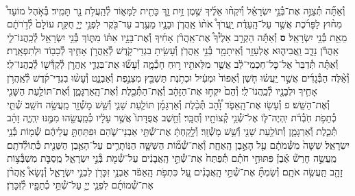 \documentclass[twoside, openany, parskip=half, 11pt]{book}
\begin{document}
\begin{footnotesize}
\begin{multicols}{2}
\\
וְ֯אַתָּ֞ה תְּ֯צַוֶּ֣ה אֶת־בְּ֯נֵ֣י יִשְׂרָאֵ֗ל וְ֯יִקְח֨וּ אֵלֶ֜יךָ שֶׁ֣מֶן זַ֥יִת זָ֛ךְ כָּתִ֖ית לַמָּא֑וֹר לְ֯הַֽעֲלֹ֥ת נֵ֖ר תָּמִֽיד׃ בְּ֯אֹ֣הֶל מוֹעֵד֩ מִח֨וּץ לַפָּרֹ֜כֶת אֲשֶׁ֣ר עַל־הָֽעֵדֻ֗ת יַֽעֲרֹךְ֩ אֹת֨וֹ אַֽהֲרֹ֧ן וּבָנָ֛יו מֵעֶ֥רֶב עַד־בֹּ֖קֶר לִפְנֵ֣י יְיָ֑ חֻקַּ֤ת עוֹלָם֙ לְ֯דֹ֣רֹתָ֔ם מֵאֵ֖ת בְּ֯נֵ֥י יִשְׂרָאֵֽל׃ \textbf{ס} וְ֯אַתָּ֡ה הַקְרֵ֣ב אֵלֶ֩יךָ֩ אֶת־אַֽהֲרֹ֨ן אָחִ֜יךָ וְ֯אֶת־בָּנָ֣יו אִתּ֗וֹ מִתּ֛וֹךְ בְּ֯נֵ֥י יִשְׂרָאֵ֖ל לְ֯כַֽהֲנוֹ־לִ֑י אַֽהֲרֹ֕ן נָדָ֧ב וַֽאֲבִיה֛וּא אֶלְעָזָ֥ר וְ֯אִֽיתָמָ֖ר בְּ֯נֵ֥י אַֽהֲרֹֽן׃ וְ֯עָשִׂ֥יתָ בִגְדֵי־קֹ֖דֶשׁ לְ֯אַֽהֲרֹ֣ן אָחִ֑יךָ לְ֯כָב֖וֹד וּלְתִפְאָֽרֶת׃
וְ֯אַתָּ֗ה תְּ֯דַבֵּר֙ אֶל־כׇּל־חַכְמֵי־לֵ֔ב אֲשֶׁ֥ר מִלֵּאתִ֖יו ר֣וּחַ חָכְ֯מָ֑ה וְ֯עָשׂ֞וּ אֶת־בִּגְדֵ֧י אַֽהֲרֹ֛ן לְ֯קַדְּ֯שׁ֖וֹ לְ֯כַֽהֲנוֹ־לִֽי׃ וְ֯אֵ֨לֶּה הַבְּ֯גָדִ֜ים אֲשֶׁ֣ר יַֽעֲשׂ֗וּ חֹ֤שֶׁן וְ֯אֵפוֹד֙ וּמְעִ֔יל וּכְתֹ֥נֶת תַּשְׁבֵּ֖ץ מִצְנֶ֣פֶת וְ֯אַבְנֵ֑ט וְ֯עָשׂ֨וּ בִגְדֵי־קֹ֜דֶשׁ לְ֯אַֽהֲרֹ֥ן אָחִ֛יךָ וּלְבָנָ֖יו לְ֯כַֽהֲנוֹ־לִֽי׃ וְ֯הֵם֙ יִקְח֣וּ אֶת־הַזָּהָ֔ב וְ֯אֶֽת־הַתְּ֯כֵ֖לֶת וְ֯אֶת־הָֽאַרְגָּמָ֑ן וְ֯אֶת־תּוֹלַ֥עַת הַשָּׁנִ֖י וְ֯אֶת־הַשֵּֽׁשׁ׃ פ
וְ֯עָשׂ֖וּ אֶת־הָֽאֵפֹ֑ד זָ֠הָ֠ב תְּ֯כֵ֨לֶת וְ֯אַרְגָּמָ֜ן תּוֹלַ֧עַת שָׁנִ֛י וְ֯שֵׁ֥שׁ מָשְׁ֯זָ֖ר מַֽעֲשֵׂ֥ה חֹשֵֽׁב׃ שְׁ֯תֵּ֧י כְ֯תֵפֹ֣ת חֹֽבְ֯רֹ֗ת יִֽהְיֶה־לּ֛וֹ אֶל־שְׁ֯נֵ֥י קְ֯צוֹתָ֖יו וְ֯חֻבָּֽר׃ וְ֯חֵ֤שֶׁב אֲפֻדָּתוֹ֙ אֲשֶׁ֣ר עָלָ֔יו כְּ֯מַֽעֲשֵׂ֖הוּ מִמֶּ֣נּוּ יִֽהְיֶ֑ה זָהָ֗ב תְּ֯כֵ֧לֶת וְ֯אַרְגָּמָ֛ן וְ֯תוֹלַ֥עַת שָׁנִ֖י וְ֯שֵׁ֥שׁ מָשְׁ֯זָֽר׃ וְ֯לָ֣קַחְתָּ֔ אֶת־שְׁ֯תֵּ֖י אַבְנֵי־שֹׁ֑הַם וּפִתַּחְתָּ֣ עֲלֵיהֶ֔ם שְׁ֯מ֖וֹת בְּ֯נֵ֥י יִשְׂרָאֵֽל׃
שִׁשָּׁה֙ מִשְּׁ֯מֹתָ֔ם עַ֖ל הָאֶ֣בֶן הָֽאֶחָ֑ת וְ֯אֶת־שְׁ֯מ֞וֹת הַשִּׁשָּׁ֧ה הַנּֽוֹתָרִ֛ים עַל־הָאֶ֥בֶן הַשֵּׁנִ֖ית כְּ֯תֽוֹלְ֯דֹתָֽם׃ מַֽעֲשֵׂ֣ה חָרַשׁ֘ אֶ֒בֶן֒ פִּתּוּחֵ֣י חֹתָ֗ם תְּ֯פַתַּח֙ אֶת־שְׁ֯תֵּ֣י הָֽאֲבָנִ֔ים עַל־שְׁ֯מֹ֖ת בְּ֯נֵ֣י יִשְׂרָאֵ֑ל מֻֽסַבֹּ֛ת מִשְׁבְּ֯צ֥וֹת זָהָ֖ב תַּֽעֲשֶׂ֥ה אֹתָֽם׃ וְ֯שַׂמְתָּ֞ אֶת־שְׁ֯תֵּ֣י הָֽאֲבָנִ֗ים עַ֚ל כִּתְפֹ֣ת הָֽאֵפֹ֔ד אַבְנֵ֥י זִכָּרֹ֖ן לִבְנֵ֣י יִשְׂרָאֵ֑ל וְ֯נָשָׂא֩ אַֽהֲרֹ֨ן אֶת־שְׁ֯מוֹתָ֜ם לִפְנֵ֧י יְיָ֛ עַל־שְׁ֯תֵּ֥י כְ֯תֵפָ֖יו לְ֯זִכָּרֹֽן׃


\end{multicols}
\end{footnotesize}
\end{document}
